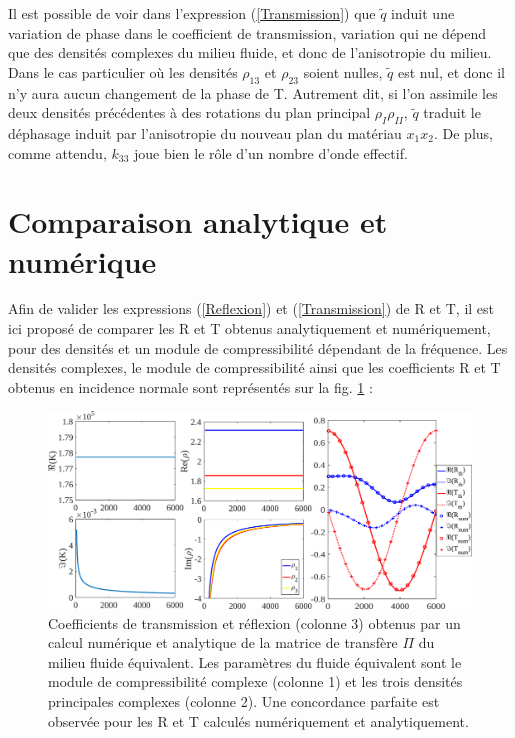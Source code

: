 \documentclass[twoside,openright]{report}
\begin{document}
    Il est possible de voir dans l'expression (\ref{Transmission}) que $\tilde{q}$ induit une variation de phase dans le coefficient de transmission, variation qui ne dépend que des densités complexes du milieu fluide, et donc de l'anisotropie du milieu. Dans le cas particulier où les densités $\rho_{13}$ et $\rho_{23}$ soient nulles, $\tilde{q}$ est nul, et donc il n'y aura aucun changement de la phase de T. Autrement dit, si l'on assimile les deux densités précédentes à des rotations du plan principal $\rho_I\rho_{II}$, $\tilde{q}$ traduit le déphasage induit par l'anisotropie du nouveau plan du matériau $x_1x_2$. De plus, comme attendu, $k_{33}$ joue bien le rôle d'un nombre d'onde effectif.
    
\section{Comparaison analytique et numérique}
\label{Ch_Dir_S_Comp}
    Afin de valider les expressions (\ref{Reflexion}) et (\ref{Transmission}) de R et T, il est ici proposé de comparer les R et T obtenus analytiquement et numériquement, pour des densités et un module de compressibilité dépendant de la fréquence. Les densités complexes, le module de compressibilité ainsi que les coefficients R et T obtenus en incidence normale sont représentés sur la fig. \ref{RT_comp} :
\begin{figure}[ht!]
    \centering
    \includegraphics[scale=0.4]{RT_num_th.pdf}
    \caption{ Coefficients de transmission et réflexion (colonne 3) obtenus par un calcul numérique et analytique de la matrice de transfère $\Pi$ du milieu fluide équivalent. Les paramètres du fluide équivalent sont le module de compressibilité complexe (colonne 1) et les trois densités principales complexes (colonne 2). Une concordance parfaite est observée pour les R et T calculés numériquement et analytiquement.}
    \label{RT_comp}
\end{figure}
    
\end{document}
